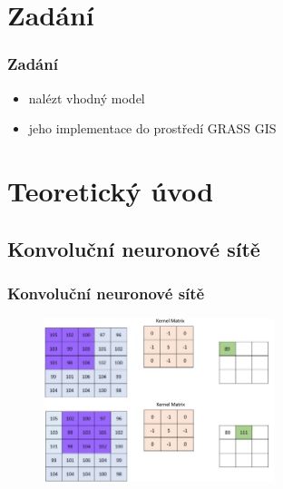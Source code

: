 \documentclass{beamer}
\begin{document}

\section{Zadání}

\begin{frame}

\frametitle{Zadání}

\begin{itemize}
	\item nalézt vhodný model
	\item jeho implementace do prostředí GRASS GIS
\end{itemize}

\end{frame}


\section{Teoretický úvod}

\subsection{Konvoluční neuronové sítě} %


\begin{frame}

\frametitle{Konvoluční neuronové sítě}

\begin{figure}[ht]
	\includegraphics[width=0.6\textwidth]{pictures/conv.jpg}
\end{figure}


\end{frame}
\end{document}
